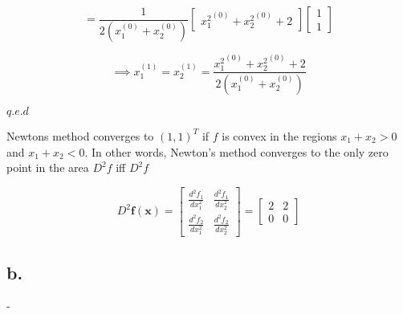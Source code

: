\documentclass[00-main.tex]{subfiles}
\begin{document}
\begin{equation}
=
\frac{1}{2(x_1^{(0)} + x_2^{(0)})} 
\left[
\begin{array}{cc} 
	{x_1^{2}}^{(0)} + {x_2^2}^{(0)} + 2 
\end{array}
\right]
\left[
\begin{array}{cc} 	
	1 \\
	1
\end{array}
\right]
\end{equation}

\begin{equation}
\implies
x_1^{(1)} = x_2^{(1)}
=
\frac{{x_1^{2}}^{(0)} + {x_2^2}^{(0)} + 2 }{2(x_1^{(0)} + x_2^{(0)})} 
\end{equation}
\label{2a}

$q.e.d$

Newtons method converges to $(1,1)^T$ if $f$ is convex in the regions $x_1+x_2>0$ and $x_1+x_2<0$. In other words, Newton's method converges to the only zero point in the area $D^2f$ iff $D^2 f$ 

\begin{equation}
D^2\mathbf{f}(\mathbf{x})
=
\left[ 	
	\begin{array}{cc} 
		\frac{d^2 f_1}{dx_1^2} & \frac{d^2 f_1}{dx_2^2} \\ 
		\frac{d^2 f_2}{dx_1^2} & \frac{d^2f_2}{dx_2^2}  
	\end{array} 
\right]
=
\left[ 	
	\begin{array}{cc} 
		2 & 2 \\ 
		0    & 0  
	\end{array} 
\right] 
\end{equation}

\subsection*{b.}
-







\end{document}
